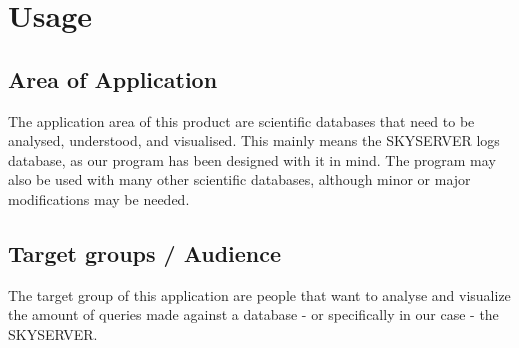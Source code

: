 \section{Usage}
\subsection{Area of Application}
The application area of this product are scientific databases that need to be analysed, understood, and visualised.
This mainly means the SKYSERVER logs database, as our program has been designed with it in mind.
The program may also be used with many other scientific databases, although minor or major modifications may be needed.


%



\subsection{Target groups / Audience}

The target group of this application are people that want to analyse 
and visualize the amount of queries made against a database - or specifically
in our case - the SKYSERVER.


